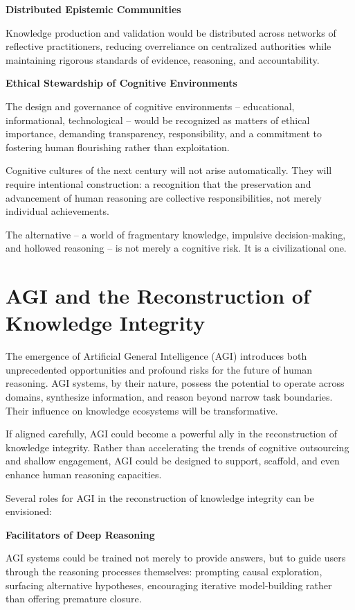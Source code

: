 \textbf{Distributed Epistemic Communities}

Knowledge production and validation would be distributed across networks
of reflective practitioners, reducing overreliance on centralized
authorities while maintaining rigorous standards of evidence, reasoning,
and accountability.

\textbf{Ethical Stewardship of Cognitive Environments}

The design and governance of cognitive environments -- educational,
informational, technological -- would be recognized as matters of ethical
importance, demanding transparency, responsibility, and a commitment to
fostering human flourishing rather than exploitation.

Cognitive cultures of the next century will not arise automatically.
They will require intentional construction: a recognition that the
preservation and advancement of human reasoning are collective
responsibilities, not merely individual achievements.

The alternative -- a world of fragmentary knowledge, impulsive
decision-making, and hollowed reasoning -- is not merely a cognitive
risk. It is a civilizational one.



\section{AGI and the Reconstruction of Knowledge Integrity}

The emergence of Artificial General Intelligence (AGI) introduces both
unprecedented opportunities and profound risks for the future of human
reasoning. AGI systems, by their nature, possess the potential to
operate across domains, synthesize information, and reason beyond narrow
task boundaries. Their influence on knowledge ecosystems will be
transformative.

If aligned carefully, AGI could become a powerful ally in the
reconstruction of knowledge integrity. Rather than accelerating the
trends of cognitive outsourcing and shallow engagement, AGI could be
designed to support, scaffold, and even enhance human reasoning
capacities.

Several roles for AGI in the reconstruction of knowledge integrity can
be envisioned:

\textbf{Facilitators of Deep Reasoning}

AGI systems could be trained not merely to provide answers, but to guide
users through the reasoning processes themselves: prompting causal
exploration, surfacing alternative hypotheses, encouraging iterative
model-building rather than offering premature closure.


